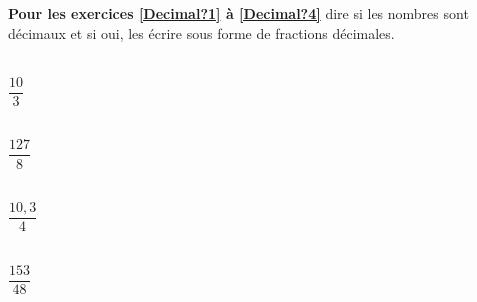 \vspace{1em}

\textbf{Pour les exercices \ref{Decimal?1} à \ref{Decimal?4}} dire si les nombres sont décimaux et si oui, les écrire sous forme de fractions décimales.

\begin{multicols}{4}
    \\
    $\dfrac{10}{3}$

    \\
    $\dfrac{127}{8}$

    \\
    $\dfrac{10,3}{4}$

    \\
    $\dfrac{153}{48}$
\end{multicols}